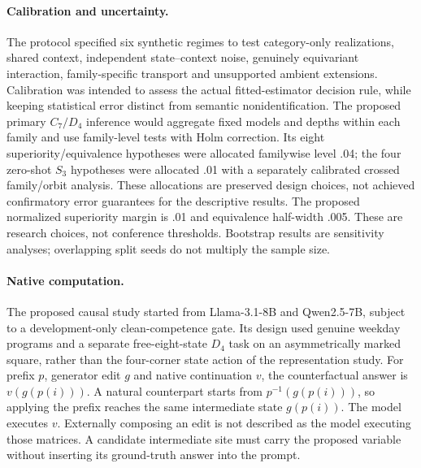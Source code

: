 \paragraph{Calibration and uncertainty.}
The protocol specified six synthetic regimes to test category-only realizations, shared context, independent state--context noise, genuinely equivariant interaction, family-specific transport and unsupported ambient extensions. Calibration was intended to assess the actual fitted-estimator decision rule, while keeping statistical error distinct from semantic nonidentification. The proposed primary $C_7/D_4$ inference would aggregate fixed models and depths within each family and use family-level tests with Holm correction. Its eight superiority/equivalence hypotheses were allocated familywise level .04; the four zero-shot $S_3$ hypotheses were allocated .01 with a separately calibrated crossed family/orbit analysis. These allocations are preserved design choices, not achieved confirmatory error guarantees for the descriptive results. The proposed normalized superiority margin is .01 and equivalence half-width .005. These are research choices, not conference thresholds. Bootstrap results are sensitivity analyses; overlapping split seeds do not multiply the sample size.

\paragraph{Native computation.}
The proposed causal study started from Llama-3.1-8B and Qwen2.5-7B, subject to a development-only clean-competence gate. Its design used genuine weekday programs and a separate free-eight-state $D_4$ task on an asymmetrically marked square, rather than the four-corner state action of the representation study. For prefix $p$, generator edit $g$ and native continuation $v$, the counterfactual answer is $v(g(p(i)))$. A natural counterpart starts from $p^{-1}(g(p(i)))$, so applying the prefix reaches the same intermediate state $g(p(i))$. The model executes $v$. Externally composing an edit is not described as the model executing those matrices. A candidate intermediate site must carry the proposed variable without inserting its ground-truth answer into the prompt.

